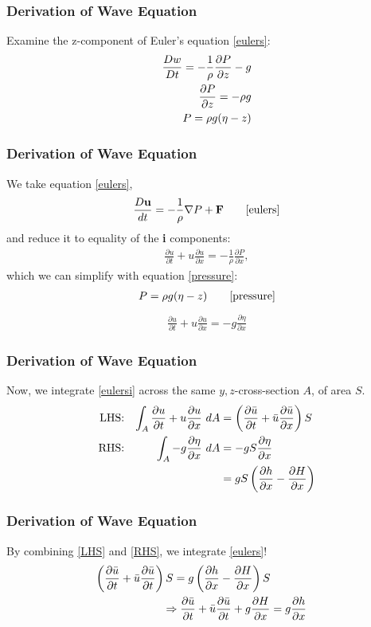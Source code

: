 \documentclass[xcolor=dvipsnames]{beamer}
\newcommand{\pderiv}[2]{\frac{ \partial #1}{\partial #2}}
\begin{document}
\begin{frame}
\frametitle{Derivation of Wave Equation}
Examine the z-component of Euler's equation \eqref{eulers}:
\begin{align}
\frac{Dw}{Dt} = -\frac{1}{\rho}\frac{\partial P}{\partial z} -g \notag\\
\frac{\partial P}{\partial z} = -\rho g \notag\\
P = \rho g (\eta - z) \label{pressure}
\end{align}
\end{frame}

\begin{frame}
\frametitle{Derivation of Wave Equation}
We take equation \eqref{eulers},
\begin{align*}
\frac{D\textbf{u}}{dt} = - \frac{1}{\rho} \nabla P + \textbf{F} \tag*{\eqref{eulers}}
\end{align*}
and reduce it to equality of the \textbf{i} components:
\begin{align*}
\pderiv{u}{t} + u\pderiv{u}{x} = -\frac{1}{\rho}\pderiv{P}{x},
\end{align*}
which we can simplify with equation \eqref{pressure}:
\begin{align*}
P = \rho g (\eta - z) \tag*{\eqref{pressure}}
\end{align*}
\begin{align}
\label{eulersi}\pderiv{u}{t} + u\pderiv{u}{x} = -g \pderiv{\eta}{x}
\end{align}
\end{frame}

\begin{frame}
\frametitle{Derivation of Wave Equation}
Now, we integrate \eqref{eulersi} across the same $y,z$-cross-section $A$, of area $S$.\\
\begin{align} 
\text{LHS:}& & \int_A \pderiv{u}{t} + u\pderiv{u}{x} \ dA &= \left( \pderiv{\bar{u}}{t} + \bar{u} \pderiv{\bar{u}}{x} \right) S  \label{LHS}\\
\text{RHS:}& & \int_A -g \pderiv{\eta}{x} \ dA &= -gS \pderiv{\eta}{x} \notag\\
& & &= gS \left( \pderiv{h}{x} - \pderiv{H}{x} \label{RHS} \right)
\end{align}
\end{frame}

\begin{frame}
\frametitle{Derivation of Wave Equation}
By combining \eqref{LHS} and \eqref{RHS}, we integrate \eqref{eulers}!
\begin{align}
\left( \pderiv{\bar{u}}{t} + \bar{u} \pderiv{\bar{u}}{t} \right) S = g \left( \pderiv{h}{x} - \pderiv{H}{x} \right) S \notag \\
\label{swe2} \Rightarrow \pderiv{\bar{u}}{t} + \bar{u} \pderiv{\bar{u}}{t} + g\pderiv{H}{x} &= g\pderiv{h}{x} 
\end{align}
\end{frame}
\end{document}
